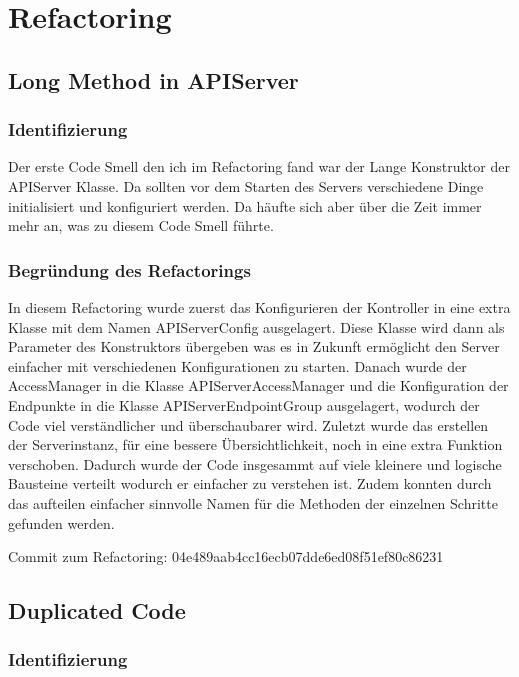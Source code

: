 \chapter{Refactoring}

\section{Long Method in APIServer}

\subsection{Identifizierung}

Der erste Code Smell den ich im Refactoring fand war der Lange Konstruktor der APIServer Klasse.
Da sollten vor dem Starten des Servers verschiedene Dinge initialisiert und konfiguriert werden.
Da häufte sich aber über die Zeit immer mehr an, was zu diesem Code Smell führte.

\subsection{Begründung des Refactorings}

In diesem Refactoring wurde zuerst das Konfigurieren der Kontroller in eine extra Klasse mit dem Namen APIServerConfig ausgelagert.
Diese Klasse wird dann als Parameter des Konstruktors übergeben was es in Zukunft ermöglicht den Server einfacher mit verschiedenen Konfigurationen zu starten.
Danach wurde der AccessManager in die Klasse APIServerAccessManager und die Konfiguration der Endpunkte in die Klasse APIServerEndpointGroup ausgelagert,
wodurch der Code viel verständlicher und überschaubarer wird.
Zuletzt wurde das erstellen der Serverinstanz, für eine bessere Übersichtlichkeit, noch in eine extra Funktion verschoben.
Dadurch wurde der Code insgesammt auf viele kleinere und logische Bausteine verteilt wodurch er einfacher zu verstehen ist.
Zudem konnten durch das aufteilen einfacher sinnvolle Namen für die Methoden der einzelnen Schritte gefunden werden.


Commit zum Refactoring: 04e489aab4cc16ecb07dde6ed08f51ef80c86231
\newpage
\section{Duplicated Code}

\subsection{Identifizierung}

